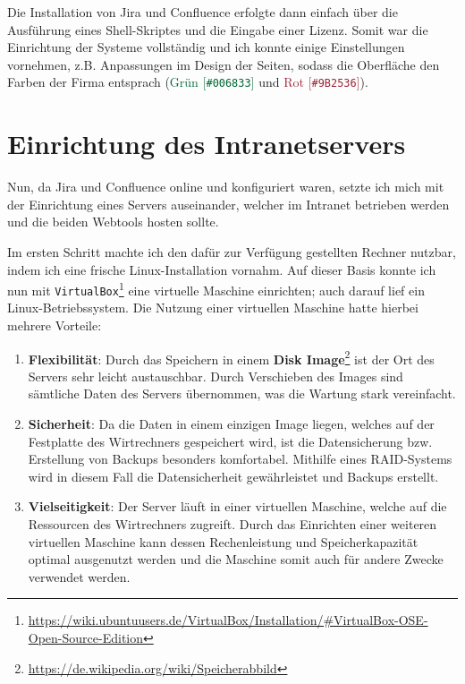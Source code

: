 Die Installation von Jira und Confluence erfolgte dann einfach über die Ausführung
eines Shell-Skriptes und die Eingabe einer Lizenz. Somit war die Einrichtung der
Systeme vollständig und ich konnte einige Einstellungen vornehmen, z.B. Anpassungen
im Design der Seiten, sodass die Oberfläche den Farben der Firma entsprach
(\textcolor[HTML]{006833}{Grün [\texttt{\#006833}]} und \textcolor[HTML]{9B2536}{Rot [\texttt{\#9B2536}]}).



\section{Einrichtung des Intranetservers}
\label{sec:jira-server}

Nun, da Jira und Confluence online und konfiguriert waren, setzte ich mich mit der
Einrichtung eines Servers auseinander, welcher im Intranet betrieben werden und
die beiden Webtools hosten sollte.

Im ersten Schritt machte ich den dafür zur Verfügung gestellten Rechner nutzbar,
indem ich eine frische Linux-Installation vornahm. Auf dieser Basis konnte ich nun
mit \texttt{VirtualBox}\footnote{\url{https://wiki.ubuntuusers.de/VirtualBox/Installation/\#VirtualBox-OSE-Open-Source-Edition}}
eine virtuelle Maschine einrichten; auch darauf lief ein Linux-Betriebssystem. Die
Nutzung einer virtuellen Maschine hatte hierbei mehrere Vorteile:

\begin{enumerate}
	\item \textbf{Flexibilität}:
	Durch das Speichern in einem \textbf{Disk Image}\footnote{\url{https://de.wikipedia.org/wiki/Speicherabbild}} ist der Ort des Servers
	sehr leicht austauschbar. Durch Verschieben des Images sind sämtliche Daten des
	Servers übernommen, was die Wartung stark vereinfacht.
	\item \textbf{Sicherheit}:
	Da die Daten in einem einzigen Image liegen, welches auf der Festplatte des
	Wirtrechners gespeichert wird, ist die Datensicherung bzw. Erstellung von Backups
	besonders komfortabel. Mithilfe eines RAID-Systems wird in diesem Fall die Datensicherheit
	gewährleistet und Backups erstellt.
	\item \textbf{Vielseitigkeit}:
	Der Server läuft in einer virtuellen Maschine, welche auf die Ressourcen
	des Wirtrechners zugreift. Durch das Einrichten einer weiteren virtuellen Maschine
	kann dessen Rechenleistung und Speicherkapazität optimal ausgenutzt werden und
	die Maschine somit auch für andere Zwecke verwendet werden.
\end{enumerate}


